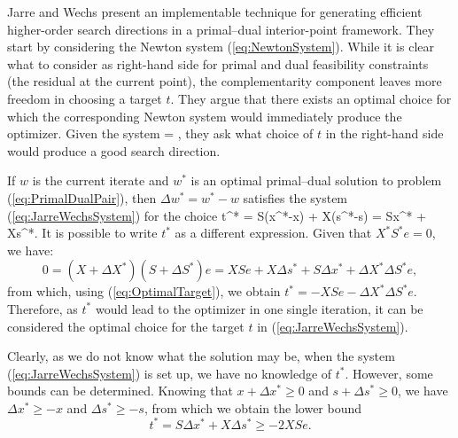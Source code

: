 Jarre and Wechs \cite{JarreWechs} %
present an implementable technique for generating efficient 
higher-order search directions in a primal--dual interior-point framework.
They start by considering the Newton system (\ref{eq:NewtonSystem}).
While it is clear what to consider as right-hand 
side for primal and dual feasibility constraints (the residual 
at the current point), the complementarity component leaves more 
freedom in choosing a target $t$. They argue that there exists 
an optimal choice for which the corresponding Newton system would 
immediately produce the optimizer.
Given the system
\be
\label{eq:JarreWechsSystem}
 =
\left[ \begin{array}{c}
    b-Ax \\ c-A^Ty-s \\ t
  \end{array} \right],
\ee
they ask what choice of $t$ in the right-hand side 
would produce a good search direction.

If $w$ is the current iterate and 
$w^*$ is an optimal primal--dual solution to 
problem (\ref{eq:PrimalDualPair}), then 
$\Delta w^*= w^*-w$ satisfies the 
system (\ref{eq:JarreWechsSystem}) for the choice
\be  \label{eq:OptimalTarget}
  t^* = S(x^*-x) + X(s^*-s) = S\Delta x^* + X\Delta s^*.
\ee
It is possible to write $t^*$ as a different expression. 
Given that $X^*S^*e=0$, we have:
\[
  0 = (X+\Delta X^*)(S+\Delta S^*)e 
    = XSe + X\Delta s^* +S\Delta x^* +\Delta X^*\Delta S^*e,
\]
from which, using (\ref{eq:OptimalTarget}), we obtain
$t^* = -XSe - \Delta X^* \Delta S^*e$.
Therefore, as $t^*$ would lead to the optimizer in one single iteration,
it can be considered the optimal choice for the target $t$
in (\ref{eq:JarreWechsSystem}).

Clearly, as we do not know what the solution may be,
when the system (\ref{eq:JarreWechsSystem}) is set up, 
we have no knowledge of $t^*$. 
However, some bounds can be determined. Knowing that 
$x+\Delta x^* \ge 0$ and $s+\Delta s^* \ge 0$, we have 
$\Delta x^* \ge -x$ and $\Delta s^* \ge -s$, from which we obtain
the lower bound
\[
  t^*= S\Delta x^* + X\Delta s^* \ge -2XSe.
\]

